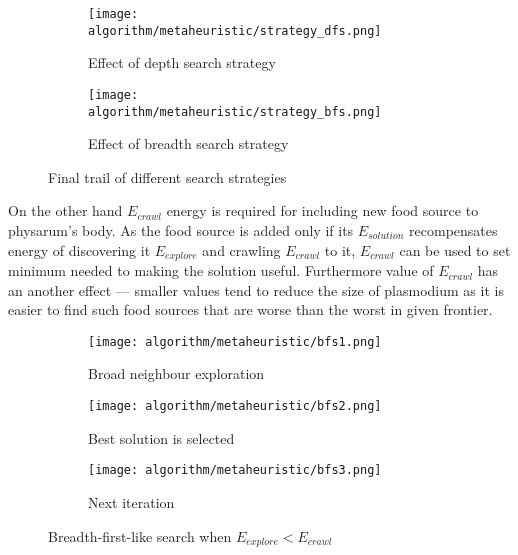 \begin{figure}
  \centering

  \begin{subfigure}{0.47\textwidth}
    \centering
    \texttt{[image: algorithm/metaheuristic/strategy\_dfs.png]}
    \caption{Effect of depth search strategy}
  \end{subfigure}
  \begin{subfigure}{0.47\textwidth}
    \centering
    \texttt{[image: algorithm/metaheuristic/strategy\_bfs.png]}
    \caption{Effect of breadth search strategy}
  \end{subfigure}

  \caption{Final trail of different search strategies}
  \label{figure:m_strategy}
\end{figure}

On the other hand $E_{crawl}$ energy is required for including new food source to physarum's body. As the food source is added only if its $E_{solution}$ recompensates energy of discovering it $E_{explore}$ and crawling $E_{crawl}$ to it, $E_{crawl}$ can be used to set minimum needed to making the solution useful. Furthermore value of $E_{crawl}$ has an another effect --- smaller values tend to reduce the size of plasmodium as it is easier to find such food sources that are worse than the worst in given frontier.

\begin{figure}
  \centering

  \begin{subfigure}{0.3\textwidth}
    \centering
    \texttt{[image: algorithm/metaheuristic/bfs1.png]}
    \caption{Broad neighbour exploration}
  \end{subfigure}
  \begin{subfigure}{0.3\textwidth}
    \centering
    \texttt{[image: algorithm/metaheuristic/bfs2.png]}
    \caption{Best solution is selected}
  \end{subfigure}
  \begin{subfigure}{0.3\textwidth}
    \centering
    \texttt{[image: algorithm/metaheuristic/bfs3.png]}
    \caption{Next iteration}
  \end{subfigure}

  \caption{Breadth-first-like search when $E_{explore} < E_{crawl}$}
  \label{figure:m_explore_bfs}
\end{figure}

